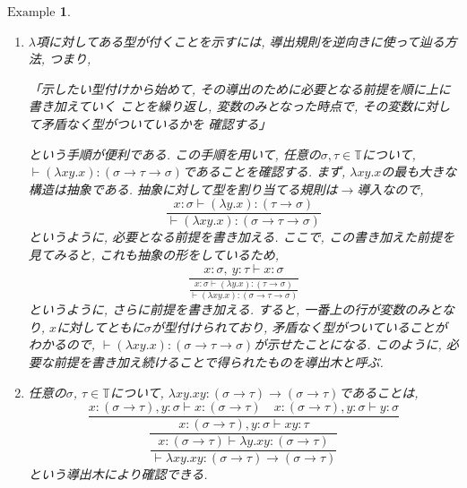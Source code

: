 \documentclass[11pt]{jsreport}
\theoremstyle{mystyle}
\newtheorem{ex}[df]{$\textrm{Example}$}
\newcommand{\T}{\mathbb{T}}
\newcommand{\0}{\textbf{0}}
\newcommand{\1}{\textbf{1}}
\newcommand{\2}{\textbf{2}}
\begin{document}
\begin{ex}%
  \begin{enumerate}
    \item $\lambda$項に対してある型が付くことを示すには, 
      導出規則を逆向きに使って辿る方法, つまり, 
      
        「示したい型付けから始めて, その導出のために必要となる前提を順に上に書き加えていく
        ことを繰り返し, 変数のみとなった時点で, その変数に対して矛盾なく型がついているかを
        確認する」
        
      という手順が便利である. この手順を用いて, 任意の$\sigma, \tau \in \T$について, 
      $\vdash (\lambda x y . x) \colon (\sigma \to \tau \to \sigma)$であることを確認する. 
      まず, $\lambda x y . x$の最も大きな構造は抽象である. 
      抽象に対して型を割り当てる規則は$\to$導入なので, 
      \[
        \frac{x \colon \sigma \vdash (\lambda y . x) \colon (\tau \to \sigma)}
          {\vdash (\lambda x y . x) \colon (\sigma \to \tau \to \sigma)}
      \]
        というように, 必要となる前提を書き加える. ここで, この書き加えた前提を見てみると, 
        これも抽象の形をしているため, 
      \[
        \frac{x \colon \sigma,\ y \colon \tau \vdash x \colon \sigma}
       {\displaystyle{\frac{x \colon \sigma \vdash (\lambda y . x) \colon (\tau \to \sigma)}
          {\vdash (\lambda x y . x) \colon (\sigma \to \tau \to \sigma)}}}
      \]
      というように, さらに前提を書き加える. すると, 一番上の行が変数のみとなり, 
      $x$に対してともに$\sigma$が型付けられており, 矛盾なく型がついていることがわかるので, 
      $\vdash (\lambda x y . x) \colon (\sigma \to \tau \to \sigma)$が示せたことになる. 
      このように, 必要な前提を書き加え続けることで得られたものを導出木と呼ぶ. 
      \item 任意の$\sigma$, $\tau \in \T$について, 
        $\lambda xy . xy \colon (\sigma \to \tau) \to (\sigma \to \tau)$であることは, 
        \[
      \dfrac{x \colon (\sigma \to \tau), y \colon \sigma \vdash x \colon (\sigma \to \tau)
      \quad x \colon (\sigma \to \tau), y \colon \sigma \vdash y \colon \sigma}
          {\dfrac{x \colon (\sigma \to \tau), y \colon \sigma \vdash xy \colon \tau}
          {\dfrac{x \colon (\sigma \to \tau) \vdash \lambda y . xy \colon (\sigma \to \tau)}
          {\vdash \lambda xy . xy \colon (\sigma \to \tau) \to (\sigma \to \tau)}}}
        \]
        という導出木により確認できる. 

\end{enumerate}
\end{ex}
\end{document}
